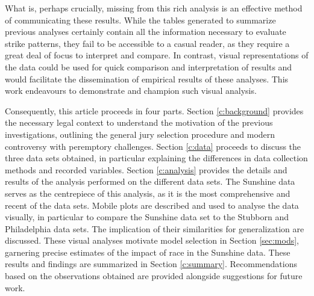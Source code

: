 What is, perhaps crucially, missing from this rich analysis is an effective method of communicating these results. While the
tables generated to summarize previous analyses certainly contain
all the information necessary to evaluate strike patterns, they fail
to be accessible to a casual reader, as they require a great deal of focus to interpret and compare. In contrast, visual
representations of the data could be used for quick
comparison and interpretation of results and would facilitate the dissemination of
empirical results of these analyses. This work endeavours to
demonstrate and champion such visual analysis.

Consequently, this article proceeds in four parts. Section \ref{c:background} provides the necessary legal context to understand the
motivation of the previous investigations, outlining the general jury
selection procedure and modern controversy with peremptory challenges. Section \ref{c:data} proceeds to discuss the three data sets obtained, in particular explaining the differences in data collection methods and recorded variables. Section \ref{c:analysis} provides the details and results
of the analysis performed on the different data sets. The Sunshine data serves as the centrepiece of this analysis, as it is the most comprehensive and recent of the data sets. Mobile plots are described and used to analyse the data visually, in particular to compare the Sunshine data set to the Stubborn and Philadelphia data sets. The implication of their similarities for generalization are discussed. These visual analyses motivate
model selection in Section \ref{sec:mods}, garnering precise estimates of the impact of race in the Sunshine data. These results and
findings are summarized in Section \ref{c:summary}. Recommendations based on the observations obtained are provided alongside suggestions for future work.
